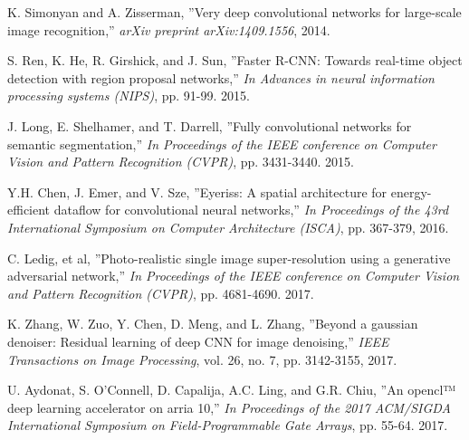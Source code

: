 \documentclass[conference]{IEEEtran}
\begin{document}
\begin{thebibliography}{9}
\footnotesize
{}
K. Simonyan and A. Zisserman,
''Very deep convolutional networks for large-scale image recognition,''
{\em arXiv preprint arXiv:1409.1556}, 2014.

S. Ren, K. He, R. Girshick, and J. Sun,
''Faster R-CNN: Towards real-time object detection with region proposal networks,''
{\em In Advances in neural information processing systems (NIPS)}, pp. 91-99. 2015.

J. Long, E. Shelhamer, and T. Darrell,
''Fully convolutional networks for semantic segmentation,''
{\em In Proceedings of the IEEE conference on Computer Vision and Pattern Recognition (CVPR)}, pp. 3431-3440. 2015.

Y.H. Chen, J. Emer, and V. Sze,
''Eyeriss: A spatial architecture for energy-efficient dataflow for convolutional neural networks,''
{\em In Proceedings of the 43rd International Symposium on Computer Architecture (ISCA)}, pp. 367-379, 2016.

C. Ledig, et al,
''Photo-realistic single image super-resolution using a generative adversarial network,''
{\em In Proceedings of the IEEE conference on Computer Vision and Pattern Recognition (CVPR)}, pp. 4681-4690. 2017.

K. Zhang, W. Zuo, Y. Chen, D. Meng, and L. Zhang,
''Beyond a gaussian denoiser: Residual learning of deep CNN for image denoising,''
{\em IEEE Transactions on Image Processing}, vol. 26, no. 7, pp. 3142-3155, 2017.



U. Aydonat, S. O'Connell, D. Capalija, A.C. Ling, and G.R. Chiu,
''An opencl™ deep learning accelerator on arria 10,''
{\em In Proceedings of the 2017 ACM/SIGDA International Symposium on Field-Programmable Gate Arrays}, pp. 55-64. 2017.


\end{thebibliography}
\end{document}
